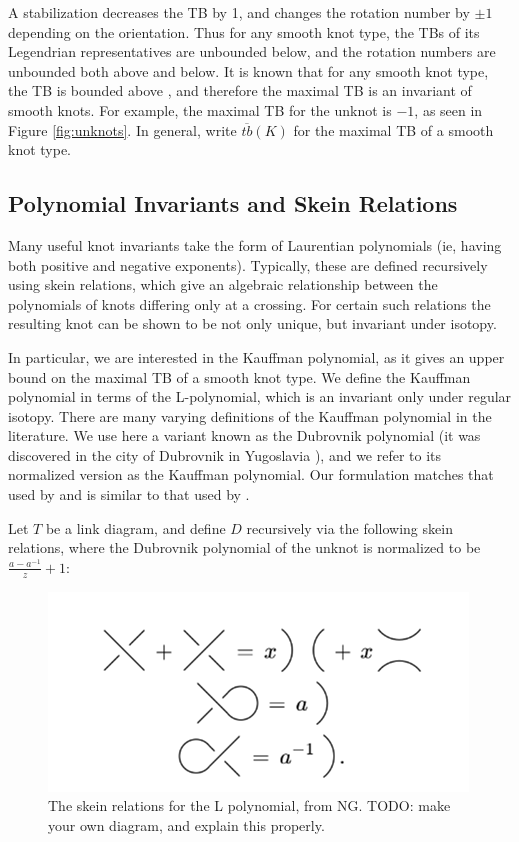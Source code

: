 A stabilization decreases the TB by 1, and changes the rotation number by $\pm 1$ depending on the orientation. Thus for any smooth knot type, the TBs of its Legendrian representatives are unbounded below, and the rotation numbers are unbounded both above and below.
It is known that for any smooth knot type, the TB is bounded above \cite{bennequin}, and therefore the maximal TB is an invariant of smooth knots. For example, the maximal TB for the unknot is $-1$, as seen in Figure \ref{fig:unknots}. In general, write $\overline{tb}(K)$ for the maximal TB of a smooth knot type.

\subsection{Polynomial Invariants and Skein Relations}

Many useful knot invariants take the form of Laurentian polynomials (ie, having both positive and negative exponents). Typically, these are defined recursively using skein relations, which give an algebraic relationship between the polynomials of knots differing only at a crossing. For certain such relations the resulting knot can be shown to be not only unique, but invariant under isotopy.

In particular, we are interested in the Kauffman polynomial, as it gives an upper bound on the maximal TB of a smooth knot type. We define the Kauffman polynomial in terms of the L-polynomial, which is an invariant only under regular isotopy.
There are many varying definitions of the Kauffman polynomial in the literature. We use here a variant known as the Dubrovnik polynomial (it was discovered in the city of Dubrovnik in Yugoslavia \cite{kauffman}), and we refer to its normalized version as the Kauffman polynomial. Our formulation matches that used by \cite{ferrand} and is similar to that used by \cite{lu-zhong}.

Let $T$ be a link diagram, and define $D$ recursively via the following skein relations, where the Dubrovnik polynomial of the unknot is normalized to be $\frac{a - a^{-1}}{z} + 1$:

\begin{figure}[ht]
    \centering
    \includegraphics[width=0.5\linewidth]{images/ng-skein.png}
    \caption{The skein relations for the L polynomial, from NG. TODO: make your own diagram, and explain this properly.}%
    \label{fig:skein}
\end{figure}

